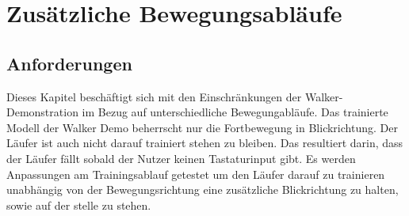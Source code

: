 \section{Zusätzliche Bewegungsabläufe}
\subsection{Anforderungen}
Dieses Kapitel beschäftigt sich mit den Einschränkungen der Walker-Demonstration im Bezug auf unterschiedliche Bewegungabläufe. Das trainierte Modell der Walker Demo beherrscht nur die Fortbewegung in Blickrichtung. Der Läufer ist auch nicht darauf trainiert stehen zu bleiben. Das resultiert darin, dass der Läufer fällt sobald der Nutzer keinen Tastaturinput gibt. Es werden Anpassungen am Trainingsablauf getestet um den Läufer darauf zu trainieren unabhängig von der Bewegungsrichtung eine zusätzliche Blickrichtung zu halten, sowie auf der stelle zu stehen. 


